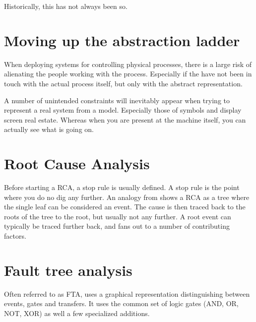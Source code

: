 \documentclass[10pt,oneside]{book}                  %
\begin{document}
Historically, this has not always been so.
\section{Moving up the abstraction ladder}
When deploying systems for controlling physical processes, there is a large risk of alienating the people working with the process. Especially if the have not been in touch with the actual process itself, but only with the abstract representation.

A number of unintended constraints will inevitably appear when trying to represent a real system from a model. Especially those of symbols and display screen real estate. Whereas when you are present at the machine itself, you can actually see what is going on.

\cite{hollnagel2005joint}%

\section{Root Cause Analysis}
Before starting a RCA, a stop rule is usually defined. A stop rule is the point where you do no dig any further. An analogy from \cite{hollnagel2004barriers} shows a RCA as a tree where the single leaf can be considered an event. The cause is then traced back to the roots of the tree to the root, but usually not any further. A root event can typically be traced further back, and fans out to a number of contributing factors.


\section{Fault tree analysis}
\label{sec:fault_tree_analysis}
Often referred to as FTA, uses a graphical representation distinguishing between events, gates and transfers. It uses the common set of logic gates (AND, OR, NOT, XOR) as well a few specialized additions.
\end{document}
